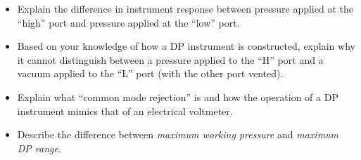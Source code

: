 \begin{itemize}
\item{} Explain the difference in instrument response between pressure applied at the ``high'' port and pressure applied at the ``low'' port.
\item{} Based on your knowledge of how a DP instrument is constructed, explain why it cannot distinguish between a pressure applied to the ``H'' port and a vacuum applied to the ``L'' port (with the other port vented).
\item{} Explain what ``common mode rejection'' is and how the operation of a DP instrument mimics that of an electrical voltmeter.
\item{} Describe the difference between {\it maximum working pressure} and {\it maximum DP range}.
\end{itemize}





